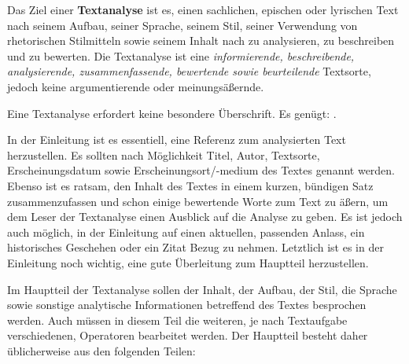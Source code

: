 



\thispagestyle{plain}



Das Ziel einer \textbf{Textanalyse} ist es, einen sachlichen, epischen oder lyrischen Text nach seinem Aufbau, seiner Sprache, seinem Stil, seiner Verwendung von rhetorischen Stilmitteln sowie seinem Inhalt nach zu analysieren, zu beschreiben und zu bewerten. Die Textanalyse ist eine \emph{informierende, beschreibende, analysierende, zusammenfassende, bewertende sowie beurteilende} Textsorte, jedoch keine argumentierende oder meinungs\"{a}\ss{}ernde. 


\begin{enumerate}


	Eine Textanalyse erfordert keine besondere \"{U}berschrift. Es gen\"{u}gt: .


	In der Einleitung ist es essentiell, eine Referenz zum analysierten Text herzustellen. Es sollten nach M\"{o}glichkeit Titel, Autor, Textsorte, Erscheinungsdatum sowie Erscheinungsort/-medium des Textes genannt werden. Ebenso ist es ratsam, den Inhalt des Textes in einem kurzen, b\"{u}ndigen Satz zusammenzufassen und schon einige bewertende Worte zum Text zu \"{a}\ss{}ern, um dem Leser der Textanalyse einen Ausblick auf die Analyse zu geben. Es ist jedoch auch m\"{o}glich, in der Einleitung auf einen aktuellen, passenden Anlass, ein historisches Geschehen oder ein Zitat Bezug zu nehmen. Letztlich ist es in der Einleitung noch wichtig, eine gute \"{U}berleitung zum Hauptteil herzustellen.


		Im Hauptteil der Textanalyse sollen der Inhalt, der Aufbau, der Stil, die Sprache sowie sonstige analytische Informationen betreffend des Textes besprochen werden. Auch m\"{u}ssen in diesem Teil die weiteren, je nach Textaufgabe verschiedenen, Operatoren bearbeitet werden. Der Hauptteil besteht daher \"{u}blicherweise aus den folgenden Teilen:

		\begin{enumerate}



\end{enumerate}
\end{enumerate}
